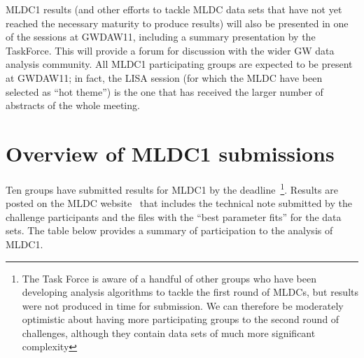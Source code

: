 \documentclass[11pt]{article}
\begin{document}
MLDC1 results (and other efforts to tackle MLDC data sets that have not yet reached the necessary maturity to produce results) will also be presented in one of the sessions at GWDAW11, including a summary presentation by the TaskForce. This will provide a forum for discussion with the wider GW data analysis community. All MLDC1 participating groups are expected to be present at GWDAW11; in fact, the LISA session (for which the MLDC have been selected as ``hot theme'') is the one that has received the larger number of abstracts of the whole meeting.

\section{Overview of MLDC1 submissions}

Ten groups have submitted results for MLDC1 by the deadline~\footnote{The Task Force is aware of a handful of other groups who have been developing analysis algorithms to tackle the first round of MLDCs, but results were not produced in time for submission. We can therefore be moderately optimistic about having more participating groups to the second round of challenges, although they contain data sets of much more significant complexity}. Results are posted on the MLDC website~\cite{mldc-results} that includes the technical note submitted by the challenge participants and the files with the ``best parameter fits'' for the data sets. The table below provides a summary of participation to the analysis of MLDC1.
\end{document}
